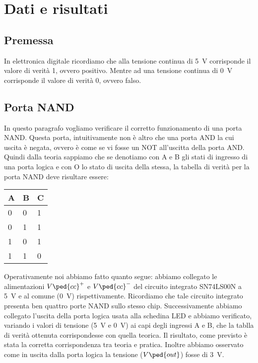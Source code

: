 \section*{Dati e risultati}

\subsection*{Premessa}

In elettronica digitale ricordiamo che alla tensione continua di \SI{+5}{\volt} corrisponde il valore di verità 1, ovvero positivo. Mentre ad una tensione continua di \SI{0}{\volt} corrisponde il valore di verità 0, ovvero falso.

\subsection*{Porta NAND}

In questo paragrafo vogliamo verificare il corretto funzionamento di una porta NAND. Questa porta, intuitivamente non è altro che una porta AND la cui uscita è negata, ovvero è come se vi fosse un NOT all'uscitta della porta AND.
Quindi dalla teoria sappiamo che se denotiamo con A e B gli stati di ingresso di una porta logica e con O lo stato di uscita della stessa, la tabella di verità per la porta NAND deve risultare essere:

\begin{center}
	\begin{tabular}{lll}
	\toprule
		A & B & C \\
	\midrule
		0 & 0 & 1 \\
		0 & 1 & 1 \\
		1 & 0 & 1 \\
		1 & 1 & 0 \\
	\bottomrule
	\end{tabular}
\end{center}

Operativamente noi abbiamo fatto quanto segue: abbiamo collegato le alimentazioni $V\ped{cc}^+$ e $V\ped{cc}^-$ del circuito integrato SN74LS00N a \SI{+5}{\volt} e al comune (\SI{0}{\volt}) rispettivamente. Ricordiamo che tale circuito integrato presenta ben quattro porte NAND sullo stesso chip. Successivamente abbiamo collegato l'uscita della porta logica usata alla schedina LED e abbiamo verificato, variando i valori di tensione (\SI{+5}{\volt} e \SI{0}{\volt}) ai capi degli ingressi A e B, che la tablla di verità ottenuta corrispondesse con quella teorica.
Il risultato, come previsto è stata la corretta corrispondenza tra teoria e pratica. Inoltre abbiamo osservato come in uscita dalla porta logica la tensione ($V\ped{out}$) fosse di \SI{+3}{\volt}.

